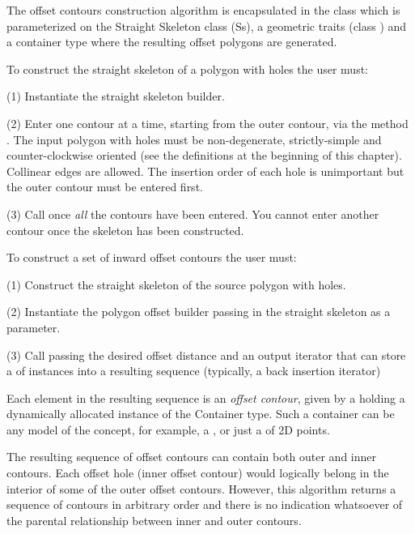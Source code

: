 The offset contours construction algorithm is encapsulated in the class
 which is
parameterized on the Straight Skeleton class (Ss), a
geometric traits (class )
and a container type where the resulting offset polygons are
generated.

To construct the straight skeleton of a polygon with holes the user must:
 
(1) Instantiate the straight skeleton builder.

(2) Enter one contour at a time, starting from the outer contour, via
    the method . The input polygon with holes must be 
    non-degenerate, strictly-simple and counter-clockwise oriented
    (see the definitions at the beginning of this chapter).
    Collinear edges are allowed. The insertion order of each hole
    is unimportant but the outer contour must be entered first.

(3) Call  once \textit{all} the contours have been entered. You
cannot enter another contour once the skeleton has been constructed.

To construct a set of inward offset contours the user must:
 
(1) Construct the straight skeleton of the source polygon with holes.

(2) Instantiate the polygon offset builder passing in the straight skeleton as a parameter.

(3) Call  passing the desired offset
    distance and an output iterator that can store a
     of  instances 
    into a resulting sequence (typically, a back insertion iterator)
    
Each element in the resulting sequence is an {\em offset contour}, given by
a  holding a dynamically allocated instance 
of the Container type. Such a container can be any model of the 
 concept, for example, a , 
or just a  of 2D points.

The resulting sequence of offset contours can contain both outer and inner contours. 
Each offset hole (inner offset contour) would logically belong in the interior of some 
of the outer offset contours.
However, this algorithm returns a sequence of contours in arbitrary order and there is no
indication whatsoever of the parental relationship between inner and outer contours.

